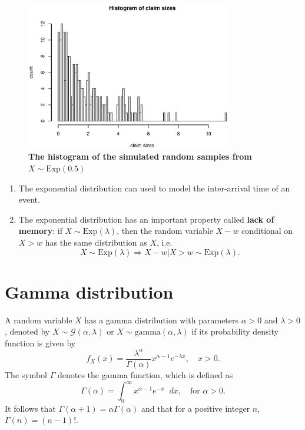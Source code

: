 \documentclass[
]{book}
\theoremstyle{definition}
\theoremstyle{definition}
\theoremstyle{definition}
\theoremstyle{definition}
\theoremstyle{remark}
\begin{document}
\begin{figure}
\hypertarget{FigHistogramExp}{%
\centering
\includegraphics[width=0.8\textwidth,height=\textheight]{FigHistogramExp.eps}
\caption{\textbf{The histogram of the simulated random samples from
\(X \sim \text{Exp}(0.5)\)}}\label{FigHistogramExp}
}
\end{figure}

\begin{enumerate}
\def\labelenumi{\arabic{enumi}.}
\item
  The exponential distribution can used to model the inter-arrival
  time of an event.
\item
  The exponential distribution has an important property called \textbf{lack
  of memory}: if \(X \sim \text{Exp}(\lambda)\), then the random
  variable \(X-w\) conditional on \(X > w\) has the same distribution as
  \(X\), i.e.
  \[X \sim \text{Exp}(\lambda)\Rightarrow  X - w | X > w \sim \text{Exp}(\lambda).\]
\end{enumerate}

\hypertarget{gamma-distribution}{%
\section{Gamma distribution}\label{gamma-distribution}}

A random variable \(X\) has a gamma distribution with parameters
\(\alpha > 0\) and \(\lambda > 0\), denoted by
\(X \sim \mathcal{G}(\alpha, \lambda)\) or
\(X \sim \text{gamma}(\alpha, \lambda)\) if its probability density
function is given by
\[f_X(x) = \frac{\lambda^\alpha}{\Gamma(\alpha)} x^{\alpha -1} e^{-\lambda x}, \quad x > 0.\]
The symbol \(\Gamma\) denotes the gamma function, which is defined as
\[\Gamma(\alpha) = \int_{0}^\infty x^{\alpha - 1} e^{-x} \mathop{}\!dx, \quad \text{for } \alpha > 0.\]
It follows that \(\Gamma(\alpha + 1) = \alpha \Gamma(\alpha)\) and that
for a positive integer \(n\), \(\Gamma(n) = (n-1)!\).
\end{document}
